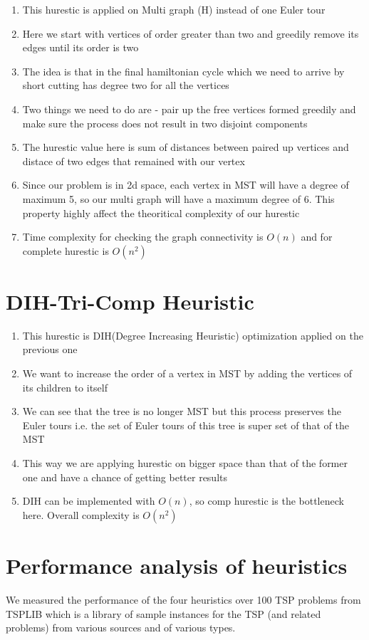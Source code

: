 \begin{enumerate}
    \item This hurestic is applied on Multi graph (H) instead of one Euler tour
    \item Here we start with vertices of order greater than two and greedily remove its edges until its order is two
    \item The idea is that in the final hamiltonian cycle which we need to arrive by short cutting has degree two for all the vertices
    \item Two things we need to do are - pair up the free vertices formed greedily and make sure the process does not result in two disjoint components
    \item The hurestic value here is sum of distances between paired up vertices and distace of two edges that remained with our vertex
    \item Since our problem is in 2d space, each vertex in MST will have a degree of maximum 5, so our multi graph will have a maximum degree of 6. This property highly affect the theoritical complexity of our hurestic
    \item Time complexity for checking the graph connectivity is $O(n)$ and for complete hurestic is $O(n^2)$
\end{enumerate}

\section{DIH-Tri-Comp Heuristic}

\begin{enumerate}
    \item This hurestic is DIH(Degree Increasing Heuristic) optimization applied on the previous one
    \item We want to increase the order of a vertex in MST by adding the vertices  of its children to itself
    \item We can see that the tree is no longer MST but this process preserves the Euler tours i.e. the set of Euler tours of this tree is super set of that of the MST
    \item This way we are applying hurestic on bigger space than that of the former one and have a chance of getting better results
    \item  DIH can be implemented with $O(n)$, so comp hurestic is the bottleneck here. Overall complexity is $O(n^2)$
\end{enumerate}

\section{Performance analysis of heuristics}

We measured the performance of the four heuristics over 100 TSP problems from TSPLIB which is a library of sample instances for the TSP (and related problems) from various sources and of various types.